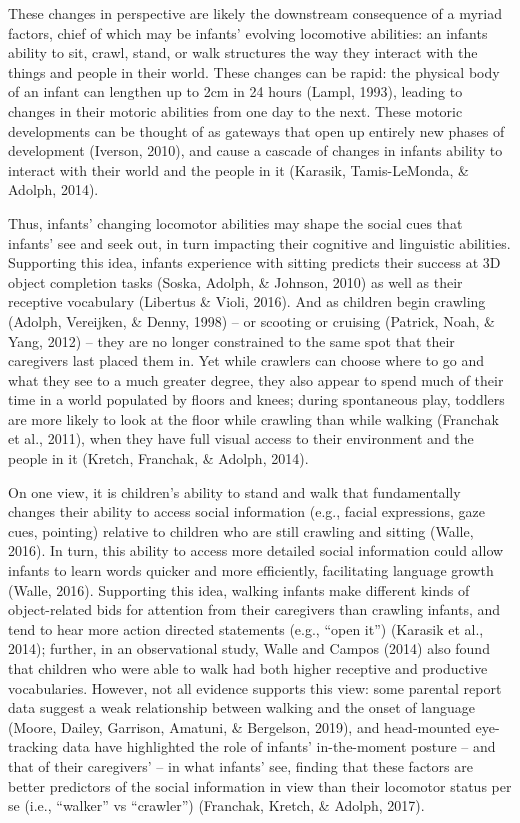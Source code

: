 \documentclass[english,man]{apa6}
\begin{document}
These changes in perspective are likely the downstream consequence of a
myriad factors, chief of which may be infants' evolving locomotive
abilities: an infants ability to sit, crawl, stand, or walk structures
the way they interact with the things and people in their world. These
changes can be rapid: the physical body of an infant can lengthen up to
2cm in 24 hours (Lampl, 1993), leading to changes in their motoric
abilities from one day to the next. These motoric developments can be
thought of as gateways that open up entirely new phases of development
(Iverson, 2010), and cause a cascade of changes in infants ability to
interact with their world and the people in it (Karasik, Tamis-LeMonda,
\& Adolph, 2014).

Thus, infants' changing locomotor abilities may shape the social cues
that infants' see and seek out, in turn impacting their cognitive and
linguistic abilities. Supporting this idea, infants experience with
sitting predicts their success at 3D object completion tasks (Soska,
Adolph, \& Johnson, 2010) as well as their receptive vocabulary
(Libertus \& Violi, 2016). And as children begin crawling (Adolph,
Vereijken, \& Denny, 1998) -- or scooting or cruising (Patrick, Noah, \&
Yang, 2012) -- they are no longer constrained to the same spot that
their caregivers last placed them in. Yet while crawlers can choose
where to go and what they see to a much greater degree, they also appear
to spend much of their time in a world populated by floors and knees;
during spontaneous play, toddlers are more likely to look at the floor
while crawling than while walking (Franchak et al., 2011), when they
have full visual access to their environment and the people in it
(Kretch, Franchak, \& Adolph, 2014).

On one view, it is children's ability to stand and walk that
fundamentally changes their ability to access social information (e.g.,
facial expressions, gaze cues, pointing) relative to children who are
still crawling and sitting (Walle, 2016). In turn, this ability to
access more detailed social information could allow infants to learn
words quicker and more efficiently, facilitating language growth (Walle,
2016). Supporting this idea, walking infants make different kinds of
object-related bids for attention from their caregivers than crawling
infants, and tend to hear more action directed statements (e.g.,
\enquote{open it}) (Karasik et al., 2014); further, in an observational
study, Walle and Campos (2014) also found that children who were able to
walk had both higher receptive and productive vocabularies. However, not
all evidence supports this view: some parental report data suggest a
weak relationship between walking and the onset of language (Moore,
Dailey, Garrison, Amatuni, \& Bergelson, 2019), and head-mounted
eye-tracking data have highlighted the role of infants' in-the-moment
posture -- and that of their caregivers' -- in what infants' see,
finding that these factors are better predictors of the social
information in view than their locomotor status per se (i.e.,
\enquote{walker} vs \enquote{crawler}) (Franchak, Kretch, \& Adolph,
2017).
\end{document}
